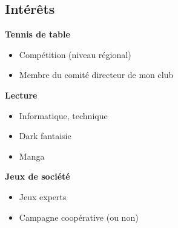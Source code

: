 \subsection*{\textcolor{maincolor}{} Intérêts}
\small

\hspace{4pt}\textbf{\color{maincolor}Tennis de table}
\begin{itemize}[leftmargin=11pt, itemsep=1pt, label={}]
    \item Compétition (niveau régional)
    \item Membre du comité directeur de mon club
\end{itemize}

\hspace{4pt}\textbf{\color{maincolor}Lecture}
\begin{itemize}[leftmargin=11pt, itemsep=1pt, label={}]
    \item Informatique, technique
    \item Dark fantaisie
    \item Manga
\end{itemize}

\hspace{4pt}\textbf{\color{maincolor}Jeux de société}
\begin{itemize}[leftmargin=11pt, itemsep=1pt, label={}]
    \item Jeux experts
    \item Campagne coopérative (ou non)
\end{itemize}
